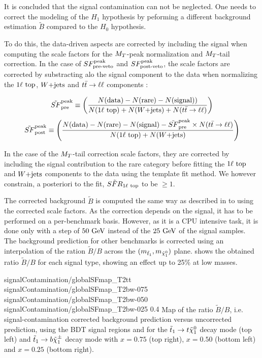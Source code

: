        It is concluded that the signal contamination can not be neglected. One needs to correct the modeling
        of the $H_1$ hypothesis by peforming a different background estimation $\tilde{B}$ compared to the
        $H_0$ hypothesis.

        To do this, the data-driven aspects are corrected by including the signal when computing the scale factors for the
        $M_T$-peak normalization and $M_T$-tail correction. In the case of $SF_{\text{pre-veto}}^{\text{peak}}$ and $SF_{\text{post-veto}}^{\text{peak}}$, the scale factors
        are corrected by substracting alo the signal component to the data when normalizing the $1\ell~\text{top}$, $\text{$W$+jets}$
        and $t\bar{t} \rightarrow \ell \ell$ components :

        \begin{equation}
            \tilde{SF}_{\text{pre}}^{\text{peak}} \equiv \left( \frac{N(\text{data}) - N(\text{rare}) - N(\text{signal}))}{N(1\ell~\text{top}) + N(\text{$W$+jets}) + N(t\bar{t} \rightarrow \ell \ell)} \right)
        \end{equation}
        \begin{equation}
            \tilde{SF}_{\text{post}}^{\text{peak}} \equiv \left( \frac{N(\text{data}) - N(\text{rare}) - N(\text{signal}) - \tilde{SF}_{\text{pre}}^{\text{peak}} \times N(t\bar{t} \rightarrow \ell \ell)}{N(1\ell~\text{top}) + N(\text{$W$+jets})} \right)
        \end{equation}

        In the case of the $M_T$-tail correction scale factors, they are corrected by including the signal contribution
        to the rare category before fitting the $1\ell~\text{top}$ and $\text{$W$+jets}$ components to the data using the template
        fit method. We however constrain, a posteriori to the fit, $\tilde{SFR}_{1\ell~\text{top}}$ to be $\geq 1$.

        The corrected background $\tilde{B}$ is computed the same way as described in  to 
        using the corrected scale factors. As the correction depends on the signal, it has to be performed on a per-benchmark
        basis. However, as it is a CPU intensive task, it is done only with a step of $50 ~\text{GeV}$ instead of the $25 ~\text{GeV}$
        of the signal samples. The background prediction for other benchmarks is corrected using an interpolation of
        the ration $\tilde{B}/B$ across the $(m_{\tilde{t}_1},m_{\tilde{\chi}_1^0})$ plane.  shows
        the obtained ratio $\tilde{B}/B$ for each signal type, showing an effect up to 25\% at low masses.

                          {signalContamination/globalSFmap_T2tt}
                          {signalContamination/globalSFmap_T2bw-075}
                          {signalContamination/globalSFmap_T2bw-050}
                          {signalContamination/globalSFmap_T2bw-025}
                          {0.4}
                          {Map of the ratio $\tilde{B}/B$, i.e. signal-contamination corrected background prediction versus uncorrected prediction, using the BDT signal regions and for the $\tilde{t}_1 \rightarrow t \tilde{\chi}_1^0$ decay mode (top left) and $\tilde{t}_1 \rightarrow b \tilde{\chi}_1^\pm$ decay mode with $x=0.75$ (top right), $x=0.50$ (bottom left) and $x=0.25$ (bottom right).}

